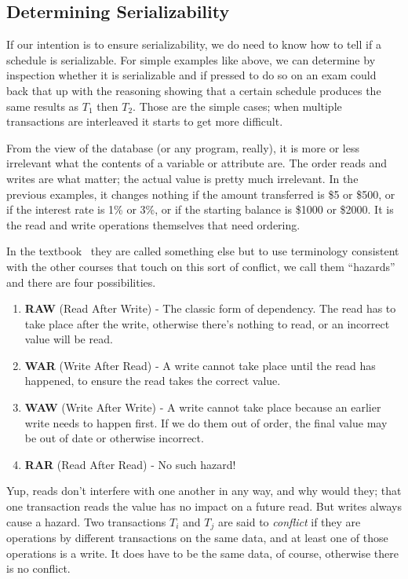 \documentclass[a4paper]{report}
\begin{document}
\subsection*{Determining Serializability}

If our intention is to ensure serializability, we do need to know how to tell if a schedule is serializable. For simple examples like above, we can determine by inspection whether it is serializable and if pressed to do so on an exam could back that up with the reasoning showing that a certain schedule produces the same results as $T_{1}$ then $T_{2}$. Those are the simple cases; when multiple transactions are interleaved it starts to get more difficult.

From the view of the database (or any program, really), it is more or less irrelevant what the contents of a variable or attribute are. The order reads and writes are what matter; the actual value is pretty much irrelevant. In the previous examples, it changes nothing if the amount transferred is \$5 or \$500, or if the interest rate is 1\% or 3\%, or if the starting balance is \$1000 or \$2000. It is the read and write operations themselves that need ordering.

In the textbook~\cite{dsc} they are called something else but to use terminology consistent with the other courses that touch on this sort of conflict, we call them ``hazards'' and there are four possibilities.

\begin{enumerate}
	\item \textbf{RAW} (Read After Write) - The classic form of dependency. The read has to take place after the write, otherwise there's nothing to read, or an incorrect value will be read.
	\item \textbf{WAR} (Write After Read) - A write cannot take place until the read has happened, to ensure the read takes the correct value.
	\item \textbf{WAW} (Write After Write) - A write cannot take place because an earlier write needs to happen first. If we do them out of order, the final value may be out of date or otherwise incorrect.
	\item \textbf{RAR} (Read After Read) - No such hazard! 
\end{enumerate}

Yup, reads don't interfere with one another in any way, and why would they; that one transaction reads the value has no impact on a future read. But writes always cause a hazard. Two transactions $T_{i}$ and $T_{j}$ are said to \textit{conflict} if they are operations by different transactions on the same data, and at least one of those operations is a write. It does have to be the same data, of course, otherwise there is no conflict.
\end{document}
